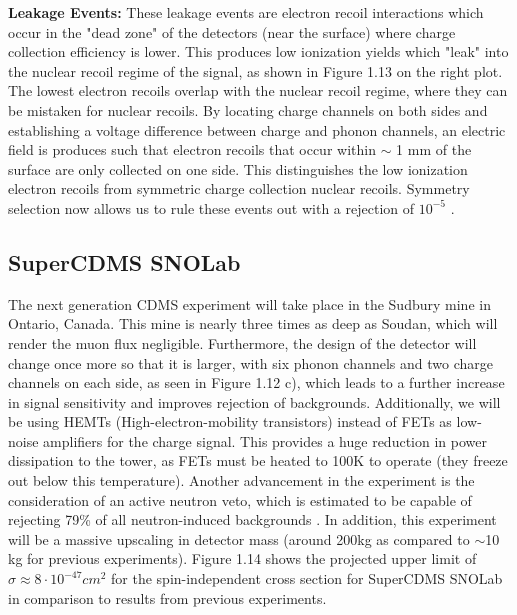 \documentclass{report}
\begin{document}
\textbf{Leakage Events:} These leakage events are electron recoil interactions which occur in the "dead zone" of the detectors (near the surface) where charge collection efficiency is lower. This produces low ionization yields which "leak" into the nuclear recoil regime of the signal, as shown in Figure 1.13 on the right plot. The lowest electron recoils overlap with the nuclear recoil regime, where they can be mistaken for nuclear recoils. By locating charge channels on both sides and establishing a voltage difference between charge and phonon channels, an electric field is produces such that electron recoils that occur within $\sim$ 1 mm of the surface are only collected on one side. This distinguishes the low ionization electron recoils from symmetric charge collection nuclear recoils. Symmetry selection now allows us to rule these events out with a rejection of $10^{-5}$ \cite{Saab2012}.

\subsection{SuperCDMS SNOLab}

The next generation CDMS experiment will take place in the Sudbury mine in Ontario, Canada. This mine is nearly three times as deep as Soudan, which will render the muon flux negligible. Furthermore, the design of the detector will change once more so that it is larger, with six phonon channels and two charge channels on each side, as seen in Figure 1.12 c), which leads to a further increase in signal sensitivity and improves rejection of backgrounds. Additionally, we will be using HEMTs (High-electron-mobility transistors) instead of FETs as low-noise amplifiers for the charge signal. This provides a huge reduction in power dissipation to the tower, as FETs must be heated to 100K to operate (they freeze out below this temperature). Another advancement in the experiment is the consideration of an active neutron veto, which is estimated to be capable of rejecting 79\% of all neutron-induced backgrounds \cite{DOE}. In addition, this experiment will be a massive upscaling in detector mass (around 200kg as compared to $\sim$10 kg for previous experiments). Figure 1.14 shows the projected upper limit of $\sigma \approx 8 \cdot 10^{-47} cm^2$ for the spin-independent cross section for SuperCDMS SNOLab in comparison to results from previous experiments.
\end{document}
